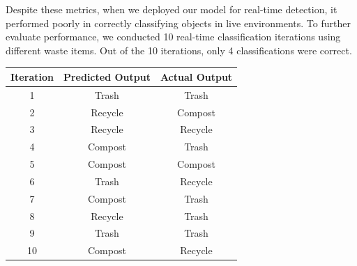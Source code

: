 \documentclass[12pt]{article}
\begin{document}
Despite these metrics, when we deployed our model for real-time detection, it performed poorly in correctly classifying objects in live environments. To further evaluate performance, we conducted 10 real-time classification iterations using different waste items. Out of the 10 iterations, only 4 classifications were correct.

\vspace{0.2cm}

\small

\begin{center}
\begin{tabular}{|c|c|c|}
\hline
\textbf{Iteration} & \textbf{Predicted Output} & \textbf{Actual Output} \\ \hline

\rowcolor{green!20}
1 & Trash & Trash \\ \hline

2 & Recycle & Compost \\ \hline

\rowcolor{green!20}
3 & Recycle & Recycle \\ \hline

4 & Compost & Trash \\ \hline

\rowcolor{green!20}
5 & Compost & Compost \\ \hline

6 & Trash & Recycle \\ \hline

7 & Compost & Trash \\ \hline

8 & Recycle & Trash \\ \hline

\rowcolor{green!20}
9 & Trash & Trash \\ \hline

10 & Compost & Recycle \\ \hline

\end{tabular}
\end{center}

\normalsize
\end{document}
